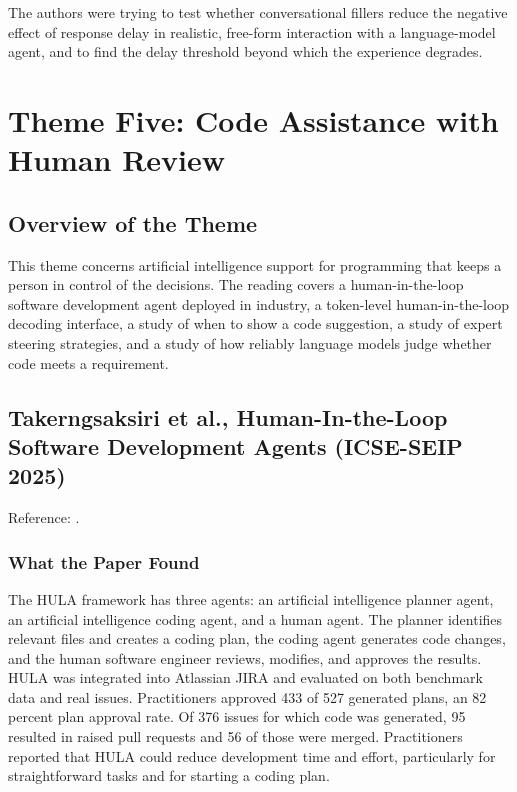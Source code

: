 \documentclass[11pt,a4paper]{report}
\begin{document}
The authors were trying to test whether conversational fillers reduce
the negative effect of response delay in realistic, free-form
interaction with a language-model agent, and to find the delay
threshold beyond which the experience degrades.

\section{Theme Five: Code Assistance with Human Review}

\subsection{Overview of the Theme}

This theme concerns artificial intelligence support for programming
that keeps a person in control of the decisions. The reading covers a
human-in-the-loop software development agent deployed in industry, a
token-level human-in-the-loop decoding interface, a study of when to
show a code suggestion, a study of expert steering strategies, and a
study of how reliably language models judge whether code meets a
requirement.

\subsection{Takerngsaksiri et al., Human-In-the-Loop Software
Development Agents (ICSE-SEIP 2025)}

\noindent Reference: \autocite{takerngsaksiri2025hula}.

\subsubsection{What the Paper Found}

The HULA framework has three agents: an artificial intelligence planner
agent, an artificial intelligence coding agent, and a human agent. The
planner identifies relevant files and creates a coding plan, the coding
agent generates code changes, and the human software engineer reviews,
modifies, and approves the results. HULA was integrated into Atlassian
JIRA and evaluated on both benchmark data and real issues. Practitioners
approved 433 of 527 generated plans, an 82 percent plan approval rate.
Of 376 issues for which code was generated, 95 resulted in raised pull
requests and 56 of those were merged. Practitioners reported that HULA
could reduce development time and effort, particularly for
straightforward tasks and for starting a coding plan.
\end{document}
